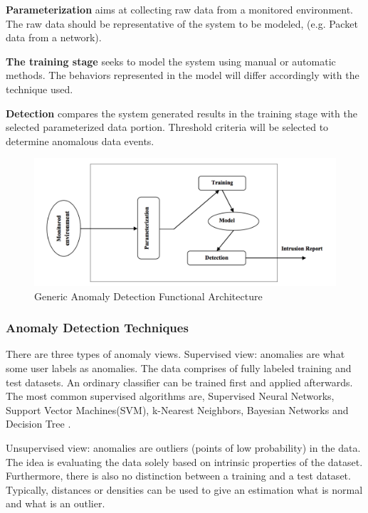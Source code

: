 \documentclass{acm_proc_article-sp}
\begin{document}
\textbf{Parameterization} aims at collecting raw data from a monitored environment. The raw data should be representative of the system to be modeled, (e.g. Packet data from a network).

\textbf{The training stage} seeks to model the system using manual or automatic methods. The behaviors represented in the model will differ accordingly with the technique used.

\textbf{Detection} compares the system generated results in the training stage with the selected parameterized data portion. Threshold criteria will be selected to determine anomalous data events\cite{Anomalyd}. 

\begin{figure}
\centering
\centering
    \includegraphics[scale=0.4]{figures/11.png}
\caption{Generic Anomaly Detection Functional Architecture}
\label{fig:anomaly}
\end{figure}

\subsubsection{Anomaly Detection Techniques}
There are three types of anomaly views.
Supervised view: anomalies are what some user labels as anomalies. The data comprises of fully labeled training and test datasets. An ordinary classifier can be trained first and applied afterwards. The most common supervised algorithms are,
Supervised Neural Networks, Support Vector Machines(SVM), k-Nearest Neighbors, Bayesian Networks and Decision Tree \cite{decisiontree}.

Unsupervised view: anomalies are outliers (points of low probability) in the data.  The idea is evaluating the data solely based on intrinsic properties of the dataset. Furthermore, there is also no distinction between a training and a test dataset. Typically, distances or densities can be used to give an estimation what is normal and what is an outlier\cite{Anomalystep}. 
\end{document}

